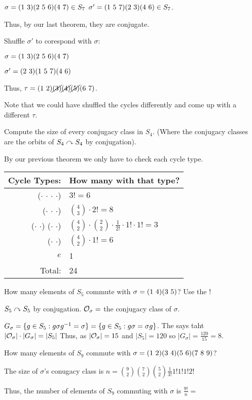 \documentclass[notes.tex]{subfiles}
\begin{document}
\begin{eg}
	$\sigma = \text{(1 3)}\text{(2 5 6)}\text{(4 7)}\in S_7$
	$\sigma' = \text{(1 5 7)}\text{(2 3)}\text{(4 6)}\in S_7$.

	Thus, by our last theorem, they are conjugate.

	Shuffle $\sigma'$ to corespond with $\sigma$:

	$\sigma = \text{(1 3)}\text{(2 5 6)}\text{(4 7)}$

	$\sigma' = \text{(2 3)}\text{(1 5 7)}\text{(4 6)}$

	Thus, $\tau=\text{(1 2)}\cancel{\text{(3)}}\cancel{\text{(4)}}\cancel{\text{(5)}}\text{(6 7)}$.

	Note that we could have shuffled the cycles differently and come up with a different $\tau$.
\end{eg}

\begin{eg}
	Compute the size of every conjugacy class in $S_4.$ (Where the conjugacy classes are the orbits of $S_4\curvearrowright S_4$ by conjugation).

	By our previous theorem we only have to check each cycle type.

	\begin{tabular}{r|l}
	Cycle Types: & How many with that type?\\\hline
	($\cdot$ $\cdot$ $\cdot$ $\cdot$) & $3!=6$\\
	($\cdot$ $\cdot$ $\cdot$) & $\binom43\cdot 2! = 8$\\
	($\cdot$ $\cdot$) ($\cdot$ $\cdot$) & $\binom42\cdot\binom22\cdot\frac{1}{2!} \cdot 1!\cdot 1! = 3$\\
	($\cdot$ $\cdot$) & $\binom42\cdot 1! = 6$\\
	$e$ & 1\\
	Total: & 24
	\end{tabular}
\end{eg}
	
\begin{eg}
	How many elements of $S_5$ commute with $\sigma = \text{(1 4)}\text{(3 5)}$?
	Use the !

	$S_5\curvearrowright S_5$ by conjugation.
	$\mathcal{O}_\sigma = $ the conjugacy class of $\sigma.$

	$G_\sigma = \{g\in S_5 : g\sigma{g}^{-1} = \sigma\} = \{g\in S_5 : g\sigma = \sigma g\}$.
	The  says taht $|\mathcal{O}_\sigma|\cdot|G_\sigma| = |S_5|$ Thus, as $|\mathcal{O}_\sigma| = 15$ and $|S_5| = 120$ so $|G_\sigma| = \frac{120}{15} = 8$.

\end{eg}

\begin{eg}
	How many elements of $S_9$ commute with $\sigma = \text{(1 2)}\text{(3 4)}\text{(5 6)}\text{(7 8 9)}$?

	The size of $\sigma$'s conugacy class is $ n =\binom92\binom72\binom52\frac{1}{3!}1!1!1!2!$

	Thus, the number of elements of $S_9$ commuting with $\sigma$ is $\frac{9!}{n} = $
\end{eg}
\end{document}
